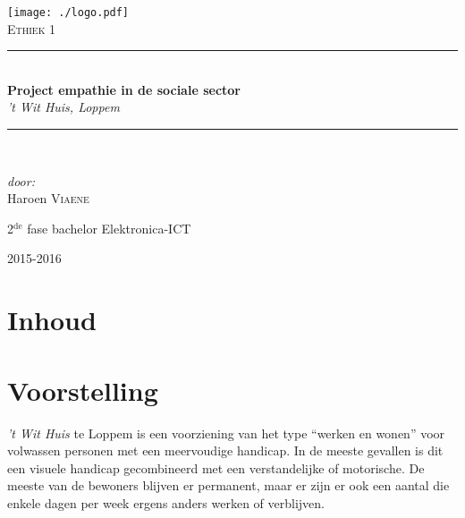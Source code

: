 \documentclass[a4paper,12pt]{article}
\newcommand{\HRule}{\rule{\linewidth}{0.5mm}}
\begin{document}
\begin{titlepage}
\begin{center}
\texttt{[image: ./logo.pdf]}~\\[1cm]


\textsc{\Large Ethiek 1}\\[0.5cm]

\HRule \\[0.4cm]
{ \LARGE \bfseries Project empathie in de sociale sector}\\[0.4cm]
{\large \emph{'t Wit Huis, Loppem}}\\[0.2cm]

\HRule \\[1.5cm]

\begin{minipage}{0.4\textwidth}
\begin{flushleft} \large
\emph{door:}\\
Haroen \textsc{Viaene}\\

\end{flushleft}
\end{minipage}
\begin{minipage}{0.4\textwidth}
\begin{flushright} \large
\large{2$^{\text{de}}$ fase bachelor Elektronica-ICT}\\
\end{flushright}
\end{minipage}

\vfill

{\large 2015-2016}

\end{center}
\end{titlepage}

\newpage

\section*{Inhoud}

\tableofcontents

\newpage

\section{Voorstelling}


\emph{’t Wit Huis} te Loppem is een voorziening van het type ``werken en wonen'' voor volwassen personen met een meervoudige handicap. In de meeste gevallen is dit een visuele handicap gecombineerd met een verstandelijke of motorische. De meeste van de bewoners blijven er permanent, maar er zijn er ook een aantal die enkele dagen per week ergens anders werken of verblijven.
\end{document}
